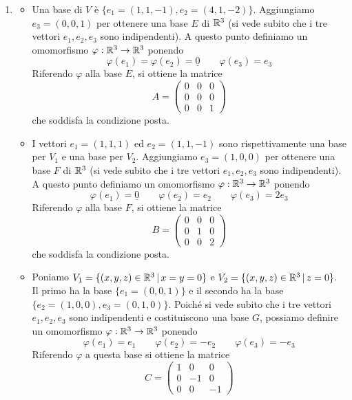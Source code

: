 \begin{enumerate}
\medskip

\item 
\begin{itemize}
\item[a)] Una base di $V$ \`{e} $\{ e_{1} = (1,1,-1), e_{2} = (4,1,-2) \}$. Aggiungiamo $e_{3} = (0,0,1)$ per ottenere una base $E$ di ${\Bbb{R}}^{3}$ (si vede subito che i tre vettori $e_{1}, e_{2}, e_{3}$ sono indipendenti). \newline
A questo punto definiamo un omomorfismo $\varphi : {\Bbb{R}}^{3} \rightarrow {\Bbb{R}}^{3}$ ponendo$$\varphi(e_{1}) = \varphi(e_{2}) = \underline{0} \qquad \varphi(e_{3}) = e_{3}$$
Riferendo $\varphi$ alla base $E$, si ottiene la matrice
$$A = \left ( \begin{array}{ccc} 0 & 0 & 0 \\ 0 & 0 & 0 \\ 0 & 0 & 1 \end{array} \right )$$
che soddisfa la condizione posta.
\item[b)] I vettori $e_{1} = (1,1,1)$ ed $e_{2} = (1,1,-1)$ sono rispettivamente una base per $V_{1}$ e una base per $V_{2}$. Aggiungiamo $e_{3} = (1,0,0)$ per ottenere una base $F$ di ${\Bbb{R}}^{3}$ (si vede subito che i tre vettori $e_{1}, e_{2}, e_{3}$ sono indipendenti). \newline
A questo punto definiamo un omomorfismo $\varphi : {\Bbb{R}}^{3} \rightarrow {\Bbb{R}}^{3}$ ponendo
$$\varphi(e_{1}) = \underline{0} \qquad \varphi(e_{2}) = e_{2} \qquad \varphi(e_{3}) = 2e_{3}$$
Riferendo $\varphi$ alla base $F$, si ottiene la matrice
$$B = \left ( \begin{array}{ccc} 0 & 0 & 0 \\ 0 & 1 & 0 \\ 0 & 0 & 2 \end{array} \right )$$
che soddisfa la condizione posta.
\item[c)] Poniamo $V_{1} = \{ (x,y,z) \in {\Bbb{R}}^{3} \,|\, x = y = 0 \}$ e $V_{2} = \{ (x,y,z) \in {\Bbb{R}}^{3} \,|\, z = 0 \}$. \newline
Il primo ha la base $\{e_{1} = (0,0,1) \}$ e il secondo ha la base $\{ e_{2} = (1,0,0), e_{3} = (0,1,0) \}$.
Poich\'{e} si vede subito che i tre vettori $e_{1}, e_{2}, e_{3}$ sono indipendenti e costituiscono una base $G$, possiamo definire un omomorfismo $\varphi : {\Bbb{R}}^{3} \rightarrow {\Bbb{R}}^{3}$ ponendo
$$\varphi(e_{1}) = e_{1} \qquad \varphi(e_{2}) = - e_{2} \qquad \varphi(e_{3}) = - e_{3}$$
Riferendo $\varphi$ a questa base si ottiene la matrice
$$C = \left ( \begin{array}{rrr} 1 & 0 & 0 \\ 0 & -1 & 0 \\ 0 & 0 & -1 \end{array} \right )$$

\end{itemize}
\end{enumerate}
